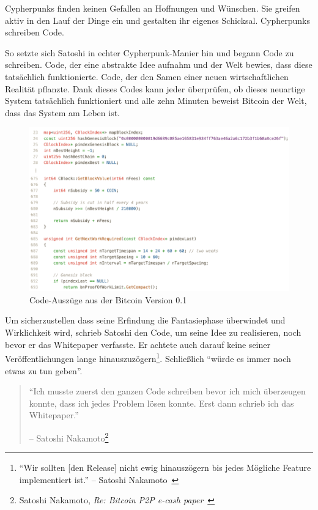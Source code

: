 Cypherpunks finden keinen Gefallen an Hoffnungen und Wünschen. Sie greifen aktiv
in den Lauf der Dinge ein und gestalten ihr eigenes Schicksal. Cypherpunks
schreiben Code.

So setzte sich Satoshi in echter Cypherpunk-Manier hin und begann Code zu
schreiben. Code, der eine abstrakte Idee aufnahm und der Welt bewies, dass diese
tatsächlich funktionierte. Code, der den Samen einer neuen wirtschaftlichen
Realität pflanzte. Dank dieses Codes kann jeder überprüfen, ob dieses neuartige
System tatsächlich funktioniert und alle zehn Minuten beweist Bitcoin der Welt,
dass das System am Leben ist.

\begin{figure}
  \includegraphics{assets/images/bitcoin-code-white.png}
  \caption{Code-Auszüge aus der Bitcoin Version 0.1}
  \label{fig:bitcoin-code-white}
\end{figure}

Um sicherzustellen dass seine Erfindung die Fantasiephase überwindet und
Wirklichkeit wird, schrieb Satoshi den Code, um seine Idee zu realisieren, noch
bevor er das Whitepaper verfasste. Er achtete auch darauf keine seiner
Veröffentlichungen lange hinauszuzögern\footnote{\enquote{Wir sollten [den
Release] nicht ewig hinauszögern bis jedes Mögliche Feature implementiert ist.}
-- Satoshi Nakamoto~\cite{satoshi-delay}}. Schließlich \enquote{würde es immer
noch etwas zu tun geben}.

\begin{quotation}\begin{samepage}
\enquote{Ich musste zuerst den ganzen Code schreiben bevor ich mich überzeugen konnte, dass ich jedes Problem lösen konnte.
Erst dann schrieb ich das Whitepaper.}
\begin{flushright} -- Satoshi Nakamoto\footnote{Satoshi Nakamoto, \textit{Re: Bitcoin P2P e-cash paper}~\cite{satoshi-mail-code-first}}
\end{flushright}\end{samepage}\end{quotation}

